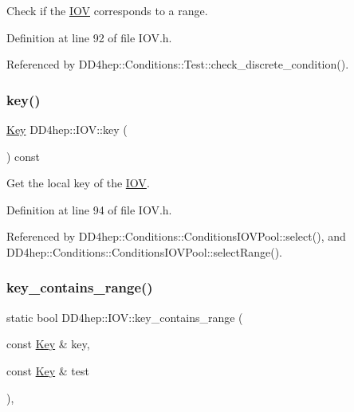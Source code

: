 Check if the \hyperlink{class_d_d4hep_1_1_i_o_v}{I\+OV} corresponds to a range. 



Definition at line 92 of file I\+O\+V.\+h.



Referenced by D\+D4hep\+::\+Conditions\+::\+Test\+::check\+\_\+discrete\+\_\+condition().

\hypertarget{class_d_d4hep_1_1_i_o_v_a314b969532607ee37e1f3ac27e4e6f58}{}\label{class_d_d4hep_1_1_i_o_v_a314b969532607ee37e1f3ac27e4e6f58} 
\subsubsection{\texorpdfstring{key()}{key()}}
{\footnotesize\ttfamily \hyperlink{class_d_d4hep_1_1_i_o_v_a07cb46dc875296dc9cccf4ff370104ae}{Key} D\+D4hep\+::\+I\+O\+V\+::key (\begin{DoxyParamCaption}{ }\end{DoxyParamCaption}) const\hspace{0.3cm}{\ttfamily [inline]}}



Get the local key of the \hyperlink{class_d_d4hep_1_1_i_o_v}{I\+OV}. 



Definition at line 94 of file I\+O\+V.\+h.



Referenced by D\+D4hep\+::\+Conditions\+::\+Conditions\+I\+O\+V\+Pool\+::select(), and D\+D4hep\+::\+Conditions\+::\+Conditions\+I\+O\+V\+Pool\+::select\+Range().

\hypertarget{class_d_d4hep_1_1_i_o_v_abb985b984cc6eb8576a4f124de7668f5}{}\label{class_d_d4hep_1_1_i_o_v_abb985b984cc6eb8576a4f124de7668f5} 
\subsubsection{\texorpdfstring{key\+\_\+contains\+\_\+range()}{key\_contains\_range()}}
{\footnotesize\ttfamily static bool D\+D4hep\+::\+I\+O\+V\+::key\+\_\+contains\+\_\+range (\begin{DoxyParamCaption}\item[{const \hyperlink{class_d_d4hep_1_1_i_o_v_a07cb46dc875296dc9cccf4ff370104ae}{Key} \&}]{key,  }\item[{const \hyperlink{class_d_d4hep_1_1_i_o_v_a07cb46dc875296dc9cccf4ff370104ae}{Key} \&}]{test }\end{DoxyParamCaption})\hspace{0.3cm}{\ttfamily [inline]}, {\ttfamily [static]}}



